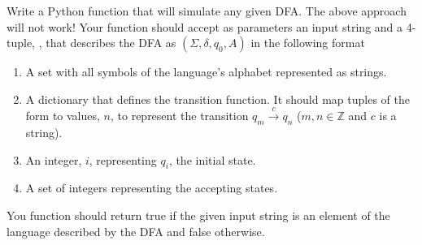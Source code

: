 \begin{problem}
Write a Python function that will simulate any given DFA.  
The above approach will not work!
Your function should accept as parameters an input string and a 4-tuple, , that describes the DFA as $(\Sigma, \delta, q_0, A)$ in the following format
\begin{enumerate}
\item A set with all symbols of the language's alphabet represented as strings.
\item A dictionary that defines the transition function.
It should map tuples of the form  to values, $n$, to represent the transition $q_m \xrightarrow{c} q_n$ ($m, n \in \mathbb{Z}$ and $c$ is a string).
\item An integer, $i$, representing $q_i$, the initial state.
\item A set of integers representing the accepting states.
\end{enumerate}
You function should return true if the given input string is an element of the language described by the DFA and false otherwise.
\label{prob:dfa_sim}
\end{problem}

